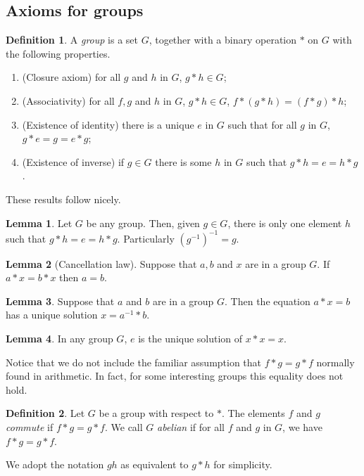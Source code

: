 \documentclass[12pt]{book}
\theoremstyle{definition}
\newtheorem{definition}{Definition}[section]
\newtheorem{lemma}{Lemma}[section]
\theoremstyle{remark}
\begin{document}
			\subsection{Axioms for groups}
				\begin{definition}
					A \textit{group}  is a set $G$, together with a binary operation $\ast$ on $G$ with the following properties.
					\begin{enumerate}
						\item (Closure axiom) for all $g$ and $h$ in $G$, $g \ast h \in G$;
						\item (Associativity) for all $f, g$ and $h$ in $G$, $g \ast h \in G$, $f\ast(g\ast h) = (f \ast g) \ast h$;
						\item (Existence of identity) there is a unique $e$ in $G$ such that for all $g$ in $G$, $g \ast e = g = e \ast g$;
						\item (Existence of inverse) if $g \in G$ there is some $h$ in $G$ such that $g \ast h = e = h \ast g$.
					\end{enumerate}
				\end{definition}
			These results follow nicely.
			\begin{lemma}
	Let $G$ be any group. Then, given $g \in G$, there is only one element $h$ such that $g \ast h = e = h \ast g $. Particularly $(g^{-1})^{-1} = g.$
			\end{lemma}
			\begin{lemma}[Cancellation law]
				Suppose that $a,b$ and $x$ are in a group $G$. If $a \ast x = b \ast x$ then $a = b$.
		\end{lemma}
				\begin{lemma}
		Suppose that $a$ and $b$ are in a group $G$. Then the equation $a \ast x = b$ has a unique solution $x = a^{-1} \ast b$.
	\end{lemma}
		\begin{lemma}
			In any group $G$, $e$ is the unique solution of $x \ast x = x$.
		\end{lemma}
		Notice that we do not include the familiar assumption that $f \ast g = g \ast f$ normally found in arithmetic. In fact, for some interesting groups this equality does not hold.
		\begin{definition}
			Let $G$ be a group with respect to $\ast$. The elements $f$ and $g$ \textit{commute} if $f \ast g = g \ast f$. We call $G$ \textit{abelian} if for all $f$ and $g$ in $G$, we have $f \ast g = g \ast f$.
		\end{definition}
		We adopt the notation $gh$ as equivalent to $g \ast h$ for simplicity.
		
\end{document}
